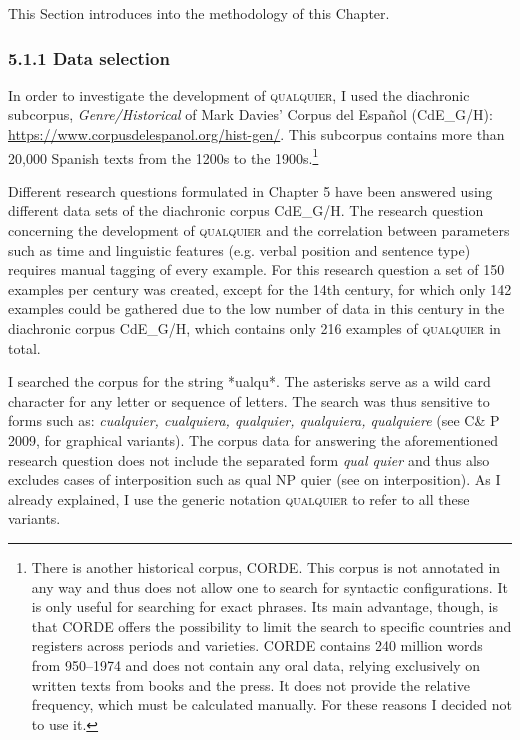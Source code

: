 \documentclass[output=paper]{langscibook}
\begin{document}
 This Section introduces into the methodology of this Chapter. 

\subsubsection{\textbf{5.1.1} \textbf{Data} \textbf{selection}}

In order to investigate the development of \textsc{qualquier}, I used the diachronic subcorpus, \textit{Genre/Historical} of Mark Davies’ Corpus del Español (CdE\_G/H): \url{https://www.corpusdelespanol.org/hist-gen/}. This subcorpus contains more than 20,000 Spanish texts from the 1200s to the 1900s.\footnote{ \textrm{There is another historical corpus, CORDE. This corpus is not annotated in any way and thus does not allow one to search for syntactic configurations. It is only useful for searching for exact phrases. Its main advantage, though, is that CORDE offers the possibility to limit the search to specific countries and registers across periods and varieties. CORDE contains 240 million words from 950–1974 and does not contain any oral data, relying exclusively on written texts from books and the press. It does not provide the relative frequency, which must be calculated manually. For these reasons I decided not to use it.}}

  Different research questions formulated in Chapter 5 have been answered using different data sets of the diachronic corpus CdE\_G/H. The research question concerning the development of \textsc{qualquier} and the correlation between parameters such as time and linguistic features (e.g. verbal position and sentence type) requires manual tagging of every example. For this research question a set of 150 examples per century was created, except for the 14th century, for which only 142 examples could be gathered due to the low number of data in this century in the diachronic corpus CdE\_G/H, which contains only 216 examples of \textsc{qualquier} in total. 

  I searched the corpus for the string *ualqu*. The asterisks serve as a wild card character for any letter or sequence of letters. The search was thus sensitive to forms such as: \textit{cualquier, cualquiera, qualquier, qualquiera, qualquiere} (see C\& P 2009, \citealt{Pato2012} for graphical variants). The corpus data for answering the aforementioned research question does not include the separated form \textit{qual quier} and thus also excludes cases of interposition such as qual NP quier (see \citealt{Pato2012} on interposition). As I already explained, I use the generic notation \textsc{qualquier} to refer to all these variants. 
\end{document}
